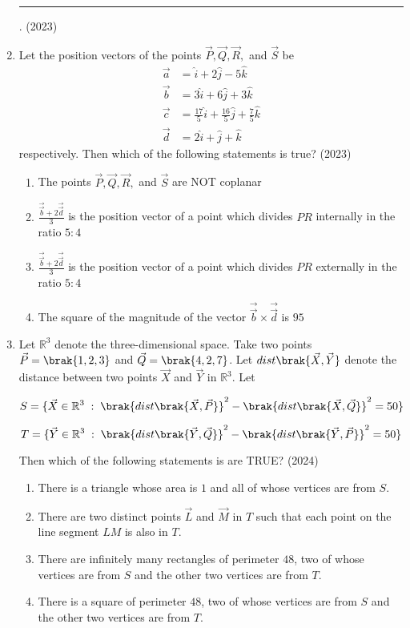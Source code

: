 \begin{enumerate}[label=\thesubsection.\arabic*.,ref=\thesubsection.\theenumi]
\rule{1cm}{0.1pt}.
\hfill (2023)
\item Let the position vectors of the points $\vec{P}, \vec{Q}, \vec{R},$ and $\vec{S}$ be
\begin{align*}
{\overrightarrow{a}} &= \hat{i} + 2\hat{j} - 5\hat{k}\\ {\overrightarrow{b}} &= 3\hat{i} + 6\hat{j} + 3\hat{k}\\ {\overrightarrow{c}} &= \frac{17}{5}\hat{i} + \frac{16}{5}\hat{j} + \frac{7}{5}\hat{k}\\ {\overrightarrow{d}} &= 2\hat{i} + \hat{j} + \hat{k}
\end{align*}
	respectively. Then which of the following statements is true?
\hfill (2023)
\begin{enumerate}
\item The points $\vec{P}, \vec{Q}, \vec{R},$ and $\vec{S}$ are NOT coplanar
\item $\frac{\vec{\overrightarrow{b}} + 2\vec{\overrightarrow{d}}}{3}$ is the position vector of a point which divides $PR$ internally in the ratio $5:4$
\item $\frac{\vec{\overrightarrow{b}} + 2\vec{\overrightarrow{d}}}{3}$ is the position vector of a point which divides $PR$ externally in the ratio $5:4$
\item The square of the magnitude of the vector $\vec{\overrightarrow{b}} \times \vec{\overrightarrow{d}}$ is $95$
\end{enumerate}
%
\item Let $\mathbb{R}^3$ denote the three-dimensional space. Take two points $\vec{P} = \brak{1,2,3}$ and $\vec{Q} = \brak{4,2,7}$. Let $dist\brak{\vec{X},\vec{Y}}$ denote the distance between two points $\vec{X}$ and $\vec{Y}$ in $\mathbb{R}^3$. Let  

\[
S = \{ \vec{X} \in \mathbb{R}^3 \; : \; \brak{dist\brak{\vec{X},\vec{P}}}^2 - \brak{dist\brak{\vec{X},\vec{Q}}}^2 = 50 \}
\]

\[
T = \{ \vec{Y} \in \mathbb{R}^3 \; : \; \brak{dist\brak{\vec{Y},\vec{Q}}}^2 - \brak{dist\brak{\vec{Y},\vec{P}}}^2 = 50 \}
\]

Then which of the following statements is {are} TRUE?
\hfill (2024)
\begin{enumerate}
\item There is a triangle whose area is $1$ and all of whose vertices are from $S$.
\item There are two distinct points $\vec{L}$ and $\vec{M}$ in $T$ such that each point on the line segment $LM$ is also in $T$.
\item There are infinitely many rectangles of perimeter $48$, two of whose vertices are from $S$ and the other two vertices are from $T$.
\item There is a square of perimeter $48$, two of whose vertices are from $S$ and the other two vertices are from $T$.
\end{enumerate}
\end{enumerate}
